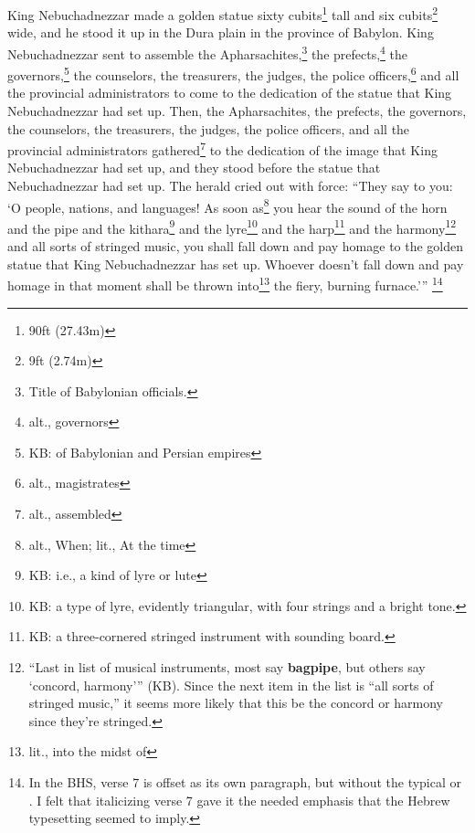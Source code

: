 
\begin{inparaenum}
     King Nebuchadnezzar made a golden statue sixty cubits\footnote{90\thinspace ft (27.43\thinspace m)} tall and six cubits\footnote{9\thinspace ft (2.74\thinspace m)} wide, and he stood it up in the Dura plain in the province of Babylon.%
     King Nebuchadnezzar sent to assemble the Apharsachites,\footnote{Title of Babylonian officials.} the prefects,\footnote{alt., governors} the governors,\footnote{KB: of Babylonian and Persian empires} the counselors, the treasurers, the judges, the police officers,\footnote{alt., magistrates} and all the provincial administrators to come to the dedication of the statue that King Nebuchadnezzar had set up.%
     Then, the Apharsachites, the prefects, the governors, the counselors, the treasurers, the judges, the police officers, and all the provincial administrators gathered\footnote{alt., assembled} to the dedication of the image that King Nebuchadnezzar had set up, and they stood before the statue that Nebuchadnezzar had set up.%
     The herald cried out with force: ``They say to you: `O people, nations, and languages!%
     As soon as\footnote{alt., When; lit., At the time} you hear the sound of the horn and the pipe and the kithara\footnote{KB: i.e., a kind of lyre or lute} and the lyre\footnote{KB: a type of lyre, evidently triangular, with four strings and a bright tone.} and the harp\footnote{KB: a three-cornered stringed instrument with sounding board.} and the harmony\footnote{``Last in list of musical instruments, most say \textbf{bagpipe}, but others say `concord, harmony'\thinspace'' (KB). Since the next item in the list is ``all sorts of stringed music,'' it seems more likely that this be the concord or harmony since they're stringed.} and all sorts of stringed music, you shall fall down and pay homage to the golden statue that King Nebuchadnezzar has set up.%
     Whoever doesn't fall down and pay homage in that moment shall be thrown into\footnote{lit., into the midst of} the fiery, burning furnace.'\thinspace''%
     \textit{}\footnote{In the BHS, verse 7 is offset as its own paragraph, but without the typical  or . I felt that italicizing verse 7 gave it the needed emphasis that the Hebrew typesetting seemed to imply.}%
    
    

\end{inparaenum}
